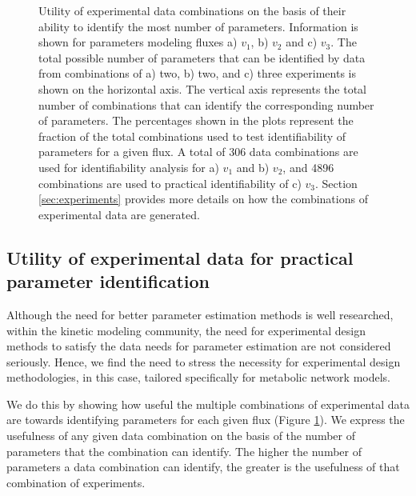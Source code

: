 \documentclass[10pt]{article}
\begin{document}
\begin{figure}[!tbhp]
	\caption{Utility of experimental data combinations on the basis of their ability to identify the most number of parameters. Information is shown for parameters modeling fluxes a) $v_1$, b) $v_2$ and c) $v_3$. The total possible number of parameters that can be identified by data from combinations of a) two, b) two, and c) three experiments is shown on the horizontal axis. The vertical axis represents the total number of combinations that can identify the corresponding number of parameters. The percentages shown in the plots represent the fraction of the total combinations used to test identifiability of parameters for a given flux. A total of 306 data combinations are used for identifiability analysis for a) $v_1$ and b) $v_2$, and 4896 combinations are used to practical identifiability of c) $v_3$. Section \ref{sec:experiments} provides more details on how the combinations of experimental data are generated.}\label{fig:figure4}
\end{figure}	
\subsection{Utility of experimental data for practical parameter identification}\label{sec:data_utility}
Although the need for better parameter estimation methods is well researched, within the kinetic modeling community, the need for experimental design methods to satisfy the data needs for parameter estimation are not considered seriously. Hence, we find the need to stress the necessity for experimental design methodologies, in this case, tailored specifically for metabolic network models. 	

We do this by showing how useful the multiple combinations of experimental data are towards identifying parameters for each given flux (Figure \ref{fig:figure4}). We express the usefulness of any given data combination on the basis of the number of parameters that the combination can identify. The higher the number of parameters a data combination can identify, the greater is the usefulness of that combination of experiments. 
\end{document}
